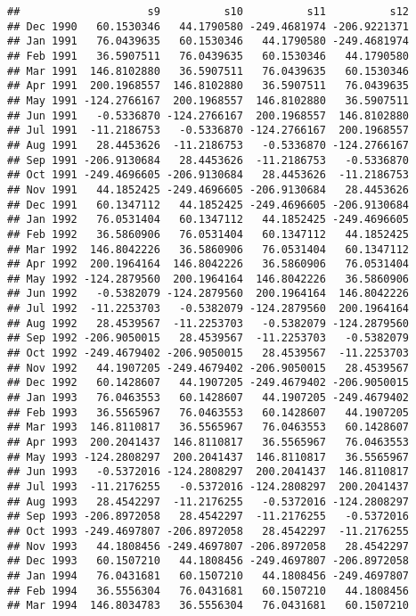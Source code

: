 \documentclass[]{article}
\begin{document}
\begin{verbatim}
##                    s9          s10          s11          s12
## Dec 1990   60.1530346   44.1790580 -249.4681974 -206.9221371
## Jan 1991   76.0439635   60.1530346   44.1790580 -249.4681974
## Feb 1991   36.5907511   76.0439635   60.1530346   44.1790580
## Mar 1991  146.8102880   36.5907511   76.0439635   60.1530346
## Apr 1991  200.1968557  146.8102880   36.5907511   76.0439635
## May 1991 -124.2766167  200.1968557  146.8102880   36.5907511
## Jun 1991   -0.5336870 -124.2766167  200.1968557  146.8102880
## Jul 1991  -11.2186753   -0.5336870 -124.2766167  200.1968557
## Aug 1991   28.4453626  -11.2186753   -0.5336870 -124.2766167
## Sep 1991 -206.9130684   28.4453626  -11.2186753   -0.5336870
## Oct 1991 -249.4696605 -206.9130684   28.4453626  -11.2186753
## Nov 1991   44.1852425 -249.4696605 -206.9130684   28.4453626
## Dec 1991   60.1347112   44.1852425 -249.4696605 -206.9130684
## Jan 1992   76.0531404   60.1347112   44.1852425 -249.4696605
## Feb 1992   36.5860906   76.0531404   60.1347112   44.1852425
## Mar 1992  146.8042226   36.5860906   76.0531404   60.1347112
## Apr 1992  200.1964164  146.8042226   36.5860906   76.0531404
## May 1992 -124.2879560  200.1964164  146.8042226   36.5860906
## Jun 1992   -0.5382079 -124.2879560  200.1964164  146.8042226
## Jul 1992  -11.2253703   -0.5382079 -124.2879560  200.1964164
## Aug 1992   28.4539567  -11.2253703   -0.5382079 -124.2879560
## Sep 1992 -206.9050015   28.4539567  -11.2253703   -0.5382079
## Oct 1992 -249.4679402 -206.9050015   28.4539567  -11.2253703
## Nov 1992   44.1907205 -249.4679402 -206.9050015   28.4539567
## Dec 1992   60.1428607   44.1907205 -249.4679402 -206.9050015
## Jan 1993   76.0463553   60.1428607   44.1907205 -249.4679402
## Feb 1993   36.5565967   76.0463553   60.1428607   44.1907205
## Mar 1993  146.8110817   36.5565967   76.0463553   60.1428607
## Apr 1993  200.2041437  146.8110817   36.5565967   76.0463553
## May 1993 -124.2808297  200.2041437  146.8110817   36.5565967
## Jun 1993   -0.5372016 -124.2808297  200.2041437  146.8110817
## Jul 1993  -11.2176255   -0.5372016 -124.2808297  200.2041437
## Aug 1993   28.4542297  -11.2176255   -0.5372016 -124.2808297
## Sep 1993 -206.8972058   28.4542297  -11.2176255   -0.5372016
## Oct 1993 -249.4697807 -206.8972058   28.4542297  -11.2176255
## Nov 1993   44.1808456 -249.4697807 -206.8972058   28.4542297
## Dec 1993   60.1507210   44.1808456 -249.4697807 -206.8972058
## Jan 1994   76.0431681   60.1507210   44.1808456 -249.4697807
## Feb 1994   36.5556304   76.0431681   60.1507210   44.1808456
## Mar 1994  146.8034783   36.5556304   76.0431681   60.1507210

\end{verbatim}
\end{document}
